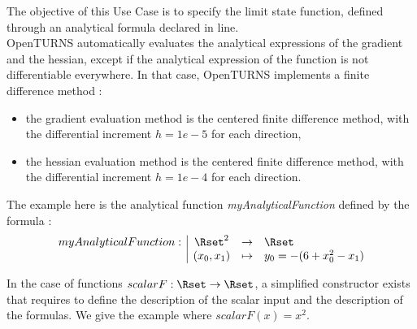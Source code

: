 \renewcommand{\filename}{docUC_LSF_Analytical.tex}
\renewcommand{\filetitle}{UC : From an analytical formula declared inline}

\HeaderIIILevel




The objective of this Use Case is to specify the limit state function, defined through an analytical formula declared in line.\\

OpenTURNS automatically evaluates the analytical expressions of the gradient and the hessian, except if the analytical expression of the function is not differentiable everywhere. In that case, OpenTURNS implements a finite difference method :
\begin{itemize}
\item the gradient evaluation method is the centered finite difference method, with the differential increment $h=1e-5$ for each direction,
\item the hessian evaluation method is the centered finite difference method, with the differential increment $h=1e-4$ for each direction.
\end{itemize}




The example here is the analytical function {\itshape myAnalyticalFunction} defined by the formula :
\begin{align*}
  \begin{array}{l|cll}
    myAnalyticalFunction : &   \Rset^2 & \rightarrow & \Rset \\
    & (x_0, x_1)     & \mapsto     & y_0 = -(6+x_0^2-x_1)
  \end{array}
\end{align*}

In the case of functions $scalarF : \Rset  \rightarrow \Rset$, a simplified constructor exists that requires to define the description of the scalar input and the description of the formulas. We give the example where $scalarF(x) = x^2$.\\

